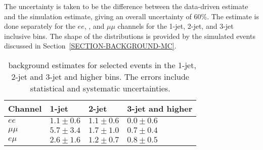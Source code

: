 \noindent
The uncertainty is taken to be the difference between the data-driven estimate and the simulation estimate, giving an overall uncertainty of 60\%. The estimate is done separately for the $ee$, \emu, and $\mu\mu$ channels for the 1-jet, 2-jet, and 3-jet inclusive bins. The shape of the distributions is provided by the simulated events discussed in Section~\ref{SECTION-BACKGROUND-MC}.

\begin{table}[!h]
\begin{center}
   \begin{tabular}{l | lll}
    \hline
    Channel &  1-jet & 2-jet & 3-jet and higher \\
    \hline
    $ee$       & $1.1\pm 0.6$  & $1.1\pm 0.6$ & $0.0\pm 0.6$\\
    $\mu\mu $  & $5.7\pm 3.4$  & $1.7\pm 1.0$ & $0.7\pm 0.4$\\
    $e\mu$     & $2.6\pm 1.6$  & $1.2\pm 0.7$ & $0.8\pm 0.5$\\
    \hline
   \end{tabular}
 \caption{\Ztt\ background estimates for selected events in the 1-jet, 2-jet and 3-jet and higher bins. The errors include statistical and systematic uncertainties.}
\label{TABLE-ZTAUTAU}
\end{center}
\end{table}
